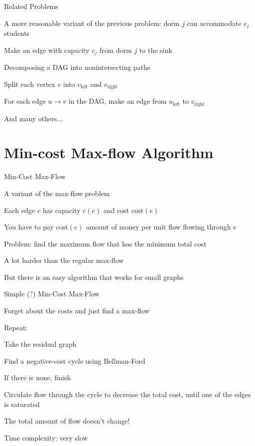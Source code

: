 \documentclass[13pt,onlymath]{beamer}
\begin{document}
\begin{frame}{Related Problems}
\BIT
\item A more reasonable variant of the previous problem: dorm $j$ can accommodate $c_j$ students
\BIT
\item Make an edge with capacity $c_j$ from dorm $j$ to the sink
\EIT
\item Decomposing a DAG into nonintersecting paths
\BIT
\item Split each vertex $v$ into $v_\mathrm{left}$ and $v_\mathrm{right}$
\item For each edge $u\rightarrow v$ in the DAG, make an edge from $u_\mathrm{left}$ to $v_\mathrm{right}$
\EIT
\item And many others...
\EIT
\end{frame}


\section{Min-cost Max-flow Algorithm}

\begin{frame}{Min-Cost Max-Flow}
\BIT
\item A variant of the max-flow problem
\item Each edge $e$ has capacity $c(e)$ and cost $\mathrm{cost}(e)$
\item You have to pay $\mathrm{cost}(e)$ amount of money per unit flow flowing through $e$
\item Problem: find the maximum flow that has the minimum total cost
\item A lot harder than the regular max-flow
\BIT
\item But there is an easy algorithm that works for small graphs
\EIT\EIT
\end{frame}

\begin{frame}{Simple (?) Min-Cost Max-Flow}
\BIT
\item Forget about the costs and just find a max-flow
\item Repeat:
\BIT
\item Take the residual graph
\item Find a negative-cost cycle using Bellman-Ford
\BIT
\item If there is none, finish
\EIT
\item Circulate flow through the cycle to decrease the total cost, until one of the edges is saturated
\BIT
\item The total amount of flow doesn't change!
\EIT\EIT
\item Time complexity: very slow
\EIT
\end{frame}
\end{document}
